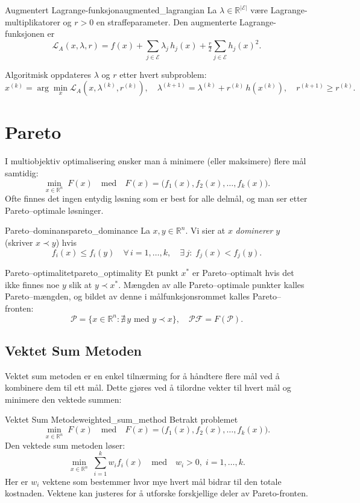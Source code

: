 \begin{definition}{Augmentert Lagrange-funksjon}{augmented_lagrangian}
    La \(\lambda\in\mathbb R^{|\mathcal E|}\) være Lagrange-multiplikatorer og \(r>0\) en straffeparameter. Den augmenterte Lagrange-funksjonen er
    \[
        \mathcal L_A(x,\lambda,r)
        = f(x)
        + \sum_{j\in\mathcal E}\lambda_j\,h_j(x)
        + \tfrac r2\sum_{j\in\mathcal E} h_j(x)^2.
    \]
\end{definition}

Algoritmisk oppdateres \(\lambda\) og \(r\) etter hvert subproblem:
\[
    x^{(k)} = \arg\min_x \mathcal L_A(x,\lambda^{(k)},r^{(k)}),
    \quad
    \lambda^{(k+1)} = \lambda^{(k)} + r^{(k)}\,h(x^{(k)}),
    \quad
    r^{(k+1)} \ge r^{(k)}.
\]

\section{Pareto}
\label{sec:pareto}

I multiobjektiv optimalisering ønsker man å minimere (eller maksimere) flere mål samtidig:
\[
    \min_{x\in\mathbb{R}^n} \;F(x)
    \quad\text{med}\quad
    F(x) = \bigl(f_1(x),f_2(x),\dots,f_k(x)\bigr).
\]
Ofte finnes det ingen entydig løsning som er best for alle delmål, og man ser etter Pareto--optimale løsninger.

\begin{definition}{Pareto--dominans}{pareto_dominance}
La \(x,y\in\mathbb R^n\). Vi sier at \(x\) \emph{dominerer} \(y\) (skriver \(x \prec y\)) hvis
\[
    f_i(x) \le f_i(y)\quad\forall\,i=1,\dots,k,
    \quad
    \exists\,j:\;f_j(x) < f_j(y).
\]
\end{definition}

\begin{definition}{Pareto--optimalitet}{pareto_optimality}
Et punkt \(x^*\) er Pareto--optimalt hvis det ikke finnes noe \(y\) slik at \(y \prec x^*\). Mængden av alle Pareto--optimale punkter kalles Pareto--mængden, og bildet av denne i målfunksjonsrommet kalles Pareto--fronten:
\[
    \mathcal P = \{x\in\mathbb R^n : \nexists\,y\text{ med }y\prec x\},
    \quad
    \mathcal{PF} = F(\mathcal P).
\]
\end{definition}

\subsection{Vektet Sum Metoden}
Vektet sum metoden er en enkel tilnærming for å håndtere flere mål ved å kombinere dem til ett mål. Dette gjøres ved å tilordne vekter til hvert mål og minimere den vektede summen:
\begin{definition}{Vektet Sum Metode}{weighted_sum_method}
    Betrakt problemet
    \[
        \min_{x\in\mathbb{R}^n} \;F(x)
        \quad\text{med}\quad
        F(x) = \bigl(f_1(x),f_2(x),\dots,f_k(x)\bigr).
    \]
    Den vektede sum metoden løser:
    \[
        \min_{x\in\mathbb{R}^n} \;\sum_{i=1}^k w_i f_i(x)
        \quad\text{med}\quad
        w_i > 0,\;i=1,\dots,k.
    \]
    Her er \(w_i\) vektene som bestemmer hvor mye hvert mål bidrar til den totale kostnaden.
    Vektene kan justeres for å utforske forskjellige deler av Pareto-fronten.
\end{definition}


